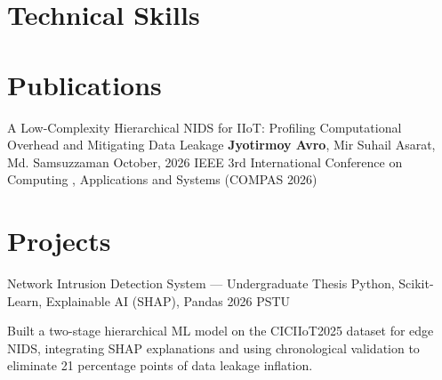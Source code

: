 \documentclass[11pt, a4paper]{article}
\begin{document}

\section{Technical Skills}


\section{Publications}
\cvPublication
    {A Low-Complexity Hierarchical NIDS for IIoT: Profiling Computational Overhead and Mitigating Data Leakage}
    {\textbf{Jyotirmoy Avro}, Mir Suhail Asarat, Md. Samsuzzaman}
    {October, 2026}
    {IEEE 3rd International Conference on Computing , Applications and Systems (COMPAS 2026)}
    {}
    {}


\section{Projects}
\cvProject
    {Network Intrusion Detection System --- Undergraduate Thesis}
    {Python, Scikit-Learn, Explainable AI (SHAP), Pandas}
    {2026}
    {PSTU}
    {
        \item Built a two-stage hierarchical ML model on the CICIIoT2025 dataset for edge NIDS, integrating SHAP explanations and using chronological validation to eliminate 21 percentage points of data leakage inflation.
    }
\end{document}
